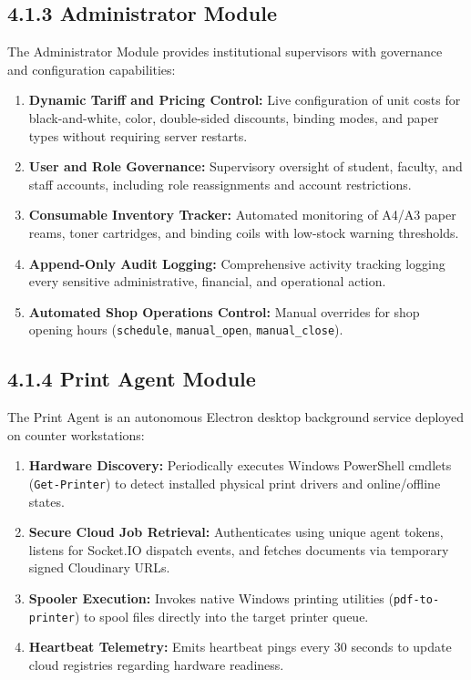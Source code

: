 \documentclass[12pt,a4paper,oneside]{report}
\begin{document}
\subsection{4.1.3 Administrator Module}
The Administrator Module provides institutional supervisors with governance and configuration capabilities:
\begin{enumerate}[leftmargin=0.35in, itemsep=2pt]
  \item \textbf{Dynamic Tariff and Pricing Control:} Live configuration of unit costs for black-and-white, color, double-sided discounts, binding modes, and paper types without requiring server restarts.
  \item \textbf{User and Role Governance:} Supervisory oversight of student, faculty, and staff accounts, including role reassignments and account restrictions.
  \item \textbf{Consumable Inventory Tracker:} Automated monitoring of A4/A3 paper reams, toner cartridges, and binding coils with low-stock warning thresholds.
  \item \textbf{Append-Only Audit Logging:} Comprehensive activity tracking logging every sensitive administrative, financial, and operational action.
  \item \textbf{Automated Shop Operations Control:} Manual overrides for shop opening hours (\texttt{schedule}, \texttt{manual\_open}, \texttt{manual\_close}).
\end{enumerate}

\subsection{4.1.4 Print Agent Module}
The Print Agent is an autonomous Electron desktop background service deployed on counter workstations:
\begin{enumerate}[leftmargin=0.35in, itemsep=2pt]
  \item \textbf{Hardware Discovery:} Periodically executes Windows PowerShell cmdlets (\texttt{Get-Printer}) to detect installed physical print drivers and online/offline states.
  \item \textbf{Secure Cloud Job Retrieval:} Authenticates using unique agent tokens, listens for Socket.IO dispatch events, and fetches documents via temporary signed Cloudinary URLs.
  \item \textbf{Spooler Execution:} Invokes native Windows printing utilities (\texttt{pdf-to-printer}) to spool files directly into the target printer queue.
  \item \textbf{Heartbeat Telemetry:} Emits heartbeat pings every 30 seconds to update cloud registries regarding hardware readiness.
\end{enumerate}
\end{document}
